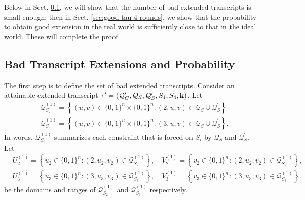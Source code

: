 Below in Sect. \ref{sec:bad-tau-4-rounds}, we will show that the number of bad extended transcripts is small enough; then in Sect. \ref{sec:good-tau-4-rounds}, we show that the probability to obtain good extension in the real world is sufficiently close to that in the ideal world. These will complete the proof.




\subsection{Bad Transcript Extensions and Probability}
\label{sec:bad-tau-4-rounds}

The first step is to define the set of bad extended transcripts. Consider an attainable extended transcript $\tau'=(\mathcal{Q}_{C}',\mathcal{Q}_{S},\mathcal{Q}_{S}',S_1,S_4,\mathbf{k})$. Let
%
$$
\begin{aligned}
&\mathcal{Q}_{S_2}^{(1)}=\left\{(u, v) \in\{0,1\}^{n} \times\{0,1\}^{n}:(2, u, v) \in \mathcal{Q}_{S} \cup \mathcal{Q}_{S}^{\prime}\right\}\\
&\mathcal{Q}_{S_3}^{(1)}=\left\{(u, v) \in\{0,1\}^{n} \times\{0,1\}^{n}:(3, u, v) \in \mathcal{Q}_{S} \cup \mathcal{Q}_{S}^{\prime}\right\}.
\end{aligned}
$$
%
In words, $\mathcal{Q}_{S_{i}}^{(1)}$ summarizes each constraint that is forced on $S_{i}$ by $\mathcal{Q}_{S}$ and $\mathcal{Q}_{S}^{\prime}$. Let        {\small
%
$$
\begin{aligned}
&U_2^{(1)}=\left\{u_2 \in\{0,1\}^{n}:\left(2, u_2, v_2\right) \in \mathcal{Q}_{S_2}^{(1)}\right\}, \quad V_2^{(1)}=\left\{v_2 \in\{0,1\}^{n}:\left(2, u_2, v_2\right) \in \mathcal{Q}_{S_2}^{(1)}\right\},\\
&U_3^{(1)}=\left\{u_3 \in\{0,1\}^{n}:\left(3, u_3, v_3\right) \in \mathcal{Q}_{S_3}^{(1)}\right\}, \quad V_3^{(1)}=\left\{v_3 \in\{0,1\}^{n}:\left(3, u_3, v_3\right) \in \mathcal{Q}_{S_3}^{(1)}\right\}.
\end{aligned}
$$
}%
%
be the domains and ranges of $\mathcal{Q}_{S_2}^{(1)}$ and $\mathcal{Q}_{S_3}^{(1)}$ respectively.




